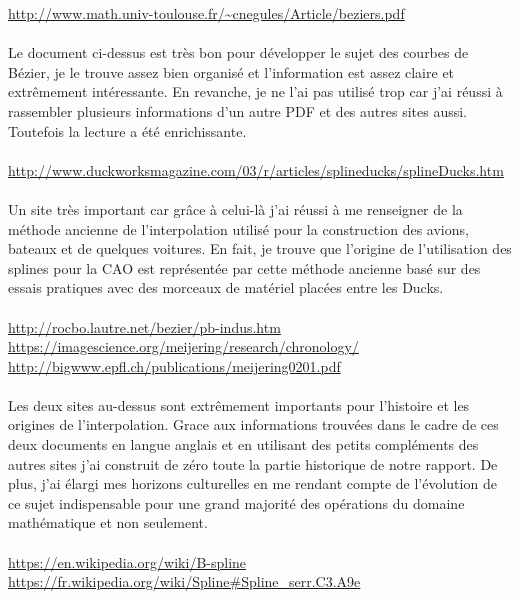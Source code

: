 \documentclass{article}
\begin{document}
{\color{blue}
\url{http://www.math.univ-toulouse.fr/~cnegules/Article/beziers.pdf}}
\\\\
Le document ci-dessus est tr\`{e}s bon pour d\'{e}velopper le sujet des courbes de B\'{e}zier, je le trouve assez
bien organis\'{e} et l'information est assez claire et extr\^{e}mement int\'{e}ressante. En revanche, je ne l'ai pas
utilis\'{e} trop car j'ai r\'{e}ussi \`{a} rassembler plusieurs informations d'un autre PDF et des autres sites aussi.
Toutefois la lecture a \'{e}t\'{e} enrichissante.
\\\\
{\color{blue}
\url{http://www.duckworksmagazine.com/03/r/articles/splineducks/splineDucks.htm}} 
\\\\
Un site tr\`{e}s important car gr\^{a}ce \`{a} celui-l\`{a} j'ai r\'{e}ussi \`{a} me renseigner de la m\'{e}thode ancienne de
l'interpolation utilis\'{e} pour la construction des avions, bateaux et de quelques voitures. En fait, je
trouve que l'origine de l'utilisation des splines pour la CAO est repr\'{e}sent\'{e}e par cette m\'{e}thode
ancienne bas\'{e} sur des essais pratiques avec des morceaux de mat\'{e}riel plac\'{e}es entre les Ducks.
\\\\
{\color{blue}
\url{http://rocbo.lautre.net/bezier/pb-indus.htm}} 
\\
{\color{blue}
\url{https://imagescience.org/meijering/research/chronology/}} 
\\
{\color{blue}
\url{http://bigwww.epfl.ch/publications/meijering0201.pdf}} 
\\\\
Les deux sites au-dessus sont extr\^{e}mement importants pour l'histoire et les origines de
l'interpolation. Grace aux informations trouv\'{e}es dans le cadre de ces deux documents en langue
anglais et en utilisant des petits compl\'{e}ments des autres sites j'ai construit de z\'{e}ro toute la partie
historique de notre rapport. De plus, j'ai \'{e}largi mes horizons culturelles en me rendant compte de l'\'{e}volution de ce sujet indispensable pour une grand majorit\'{e} des op\'{e}rations du domaine
math\'{e}matique et non seulement.
\\\\
{\color{blue}
\url{https://en.wikipedia.org/wiki/B-spline}} 
\\
{\color{blue}
\url{https://fr.wikipedia.org/wiki/Spline#Spline_serr.C3.A9e}} 
\\
\end{document}
